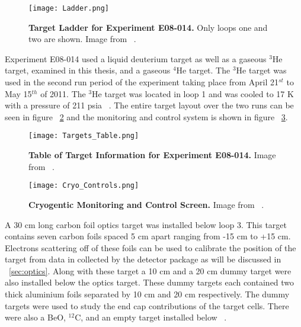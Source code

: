 \begin{figure}[!ht]
\begin{center}
\texttt{[image: Ladder.png]}
\end{center}
\caption{
{\bf{Target Ladder for Experiment E08-014.}} Only loops one and two are shown. Image from ~\cite{Thesis:Ye}.}
\label{fig:ladder}
\end{figure}

Experiment E08-014 used a liquid deuterium target as well as a gaseous $^3$He target, examined in this thesis, and a gaseous $^4$He target. The $^3$He target was used in the second run period of the experiment taking place from April 21$^{st}$ to May 15$^{th}$ of 2011. The $^3$He target was located in loop 1 and was cooled to 17 K with a pressure of 211 psia ~\cite{Thesis:Ye}. The entire target layout over the two runs can be seen in figure ~\ref{fig:targets} and the monitoring and control system is shown in figure ~\ref{fig:cryo_controls}.

\begin{figure}[!ht]
\begin{center}
\texttt{[image: Targets\_Table.png]}
\end{center}
\caption{
{\bf{Table of Target Information for Experiment E08-014.}} Image from ~\cite{Thesis:Ye}.}
\label{fig:targets}
\end{figure}

\begin{figure}[!ht]
\begin{center}
\texttt{[image: Cryo\_Controls.png]}
\end{center}
\caption{
{\bf{Cryogentic Monitoring and Control Screen.}} Image from ~\cite{Thesis:Ye}.}
\label{fig:cryo_controls}
\end{figure}

A 30 cm long carbon foil optics target was installed below loop 3. This target contains seven carbon foils spaced 5 cm apart ranging from -15 cm to +15 cm. Electrons scattering off of these foils can be used to calibrate the position of the target from data in collected by the detector package as will be discussed in ~\ref{sec:optics}. Along with these target a 10 cm and a 20 cm dummy target were also installed below the optics target. These dummy targets each contained two thick aluminium foils separated by 10 cm and 20 cm respectively. The dummy targets were used to study the end cap contributions of the target cells. There were also a BeO, $^{12}$C, and an empty target installed below ~\cite{Thesis:Ye}.  

